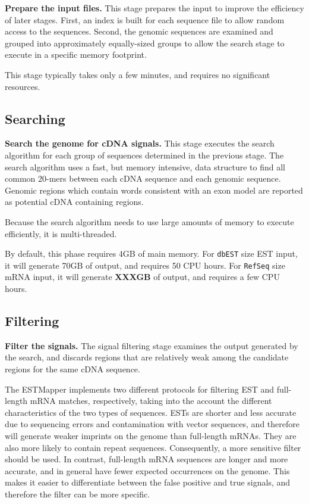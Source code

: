 \documentclass[twoside,11pt]{book}
\begin{document}
{\bf Prepare the input files.}  This stage prepares the input to
improve the efficiency of later stages.  First, an index is built for
each sequence file to allow random access to the sequences.  Second,
the genomic sequences are examined and grouped into approximately
equally-sized groups to allow the search stage to execute in a specific
memory footprint.

This stage typically takes only a few minutes, and requires no
significant resources.

\subsection*{Searching}

{\bf Search the genome for cDNA signals.}  This stage executes the
search algorithm for each group of sequences determined in the
previous stage.  The search algorithm uses a fast, but memory
intensive, data structure to find all common $20$-mers between each
cDNA sequence and each genomic sequence.  Genomic regions which
contain words consistent with an exon model are reported as potential
cDNA containing regions.

Because the search algorithm needs to use large amounts of memory to
execute efficiently, it is multi-threaded.

By default, this phase requires 4GB of main memory.  For {\tt dbEST}
size EST input, it will generate 70GB of output, and requires 50 CPU
hours.  For {\tt RefSeq} size mRNA input, it will generate {\bf XXXGB}
of output, and requires a few CPU hours.

\subsection*{Filtering}

{\bf Filter the signals.}  The signal filtering stage examines the
output generated by the search, and discards regions that
are relatively weak among the candidate regions for the same cDNA sequence.

The ESTMapper implements two different protocols for filtering EST and
full-length mRNA matches, respectively, taking into the account the
different characteristics of the two types of sequences. ESTs are
shorter and less accurate due to sequencing errors and contamination
with vector sequences, and therefore will generate weaker
imprints on the genome than full-length mRNAs. They are also more
likely to contain repeat sequences. Consequently, a more sensitive
filter should be used. In contrast, full-length mRNA sequences are
longer and more accurate, and in general have fewer expected occurrences
on the genome. This makes it easier to differentiate between the false
positive and true signals, and therefore the filter can be more specific.
\end{document}
